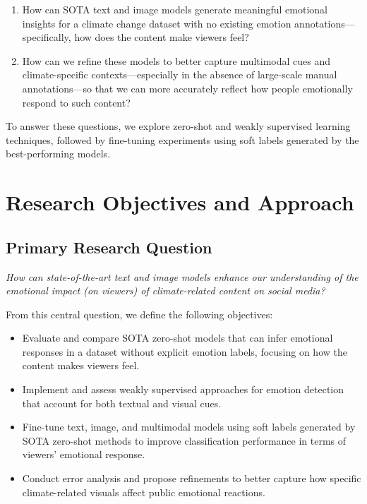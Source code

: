 \begin{enumerate}
    \item How can SOTA text and image models generate meaningful emotional insights for a climate change dataset with no existing emotion annotations—specifically, how does the content make viewers feel?
    \item How can we refine these models to better capture multimodal cues and climate-specific contexts—especially in the absence of large-scale manual annotations—so that we can more accurately reflect how people emotionally respond to such content?
\end{enumerate}

To answer these questions, we explore zero-shot and weakly supervised learning techniques, followed by fine-tuning experiments using soft labels generated by the best-performing models.

\section{Research Objectives and Approach}

\subsection{Primary Research Question}

\textit{How can state-of-the-art text and image models enhance our understanding of the \emph{emotional impact} (on viewers) of climate-related content on social media?}

From this central question, we define the following objectives:

\begin{itemize}
    \item Evaluate and compare SOTA zero-shot models that can infer emotional responses in a dataset without explicit emotion labels, focusing on how the content makes viewers feel.
    \item Implement and assess weakly supervised approaches for emotion detection that account for both textual and visual cues.
    \item Fine-tune text, image, and multimodal models using soft labels generated by SOTA zero-shot methods to improve classification performance in terms of viewers’ emotional response.
    \item Conduct error analysis and propose refinements to better capture how specific climate-related visuals affect public emotional reactions.
\end{itemize}

